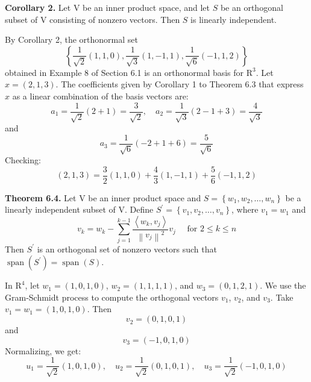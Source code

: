 \documentclass{report}
\begin{document}
    \begin{thBox}
        \textbf{Corollary 2.} Let $\mathrm{V}$ be an inner product space, and let $S$ be an orthogonal subset of $\mathrm{V}$ consisting of nonzero vectors. Then $S$ is linearly independent.
    \end{thBox}

    \begin{Example}
        By Corollary 2, the orthonormal set
        $$
        \left\{\frac{1}{\sqrt{2}}(1,1,0), \frac{1}{\sqrt{3}}(1,-1,1), \frac{1}{\sqrt{6}}(-1,1,2)\right\}
        $$
        obtained in Example 8 of Section 6.1 is an orthonormal basis for $\mathrm{R}^{3}$. Let $x=(2,1,3)$. The coefficients given by Corollary 1 to Theorem 6.3 that express $x$ as a linear combination of the basis vectors are:
        $$
        a_{1}=\frac{1}{\sqrt{2}}(2+1)=\frac{3}{\sqrt{2}}, \quad a_{2}=\frac{1}{\sqrt{3}}(2-1+3)=\frac{4}{\sqrt{3}}
        $$
        and
        $$
        a_{3}=\frac{1}{\sqrt{6}}(-2+1+6)=\frac{5}{\sqrt{6}}
        $$
        Checking:
        $$
        (2,1,3)=\frac{3}{2}(1,1,0)+\frac{4}{3}(1,-1,1)+\frac{5}{6}(-1,1,2)
        $$
    \end{Example}

    \begin{thBox}
        \textbf{Theorem 6.4.} Let $\mathrm{V}$ be an inner product space and $S=\left\{w_{1}, w_{2}, \ldots, w_{n}\right\}$ be a linearly independent subset of $\mathrm{V}$. Define $S^{\prime}=\left\{v_{1}, v_{2}, \ldots, v_{n}\right\}$, where $v_{1}=w_{1}$ and
        $$
        v_{k}=w_{k}-\sum_{j=1}^{k-1} \frac{\left\langle w_{k}, v_{j}\right\rangle}{\left\|v_{j}\right\|^{2}} v_{j} \quad \text { for } 2 \leq k \leq n
        $$
        Then $S^{\prime}$ is an orthogonal set of nonzero vectors such that $\operatorname{span}\left(S^{\prime}\right)=\operatorname{span}(S)$.
    \end{thBox}

    \begin{Example}
        In $\mathrm{R}^{4}$, let $w_{1}=(1,0,1,0)$, $w_{2}=(1,1,1,1)$, and $w_{3}=(0,1,2,1)$. We use the Gram-Schmidt process to compute the orthogonal vectors $v_{1}$, $v_{2}$, and $v_{3}$.
        Take $v_{1}=w_{1}=(1,0,1,0)$. Then
        $$
        v_{2}=(0,1,0,1)
        $$
        and
        $$
        v_{3}=(-1,0,1,0)
        $$
        Normalizing, we get:
        $$
        u_{1}=\frac{1}{\sqrt{2}}(1,0,1,0), \quad u_{2}=\frac{1}{\sqrt{2}}(0,1,0,1), \quad u_{3}=\frac{1}{\sqrt{2}}(-1,0,1,0)
        $$
    \end{Example}
\end{document}
